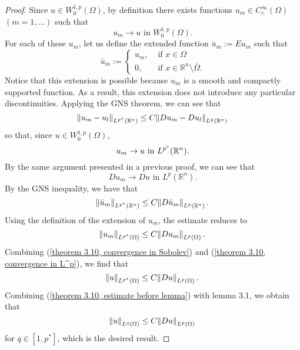 \documentclass[10pt]{article}
\begin{document}
\begin{proof}
	Since $u \in W^{1,p}_0(\Omega)$, by definition there exists functions $u_m \in C^\infty_c(\Omega)$ $(m = 1,\dots)$ such that 
	\begin{equation*}
		\displaystyle u_m \to u \textrm{ in } W^{1,p}_0(\Omega).
	\end{equation*}
	For each of these $u_m$, let us define the extended function $\bar{u}_m := Eu_m$ such that 
	\begin{equation*}
		\displaystyle \bar{u}_m := \begin{cases}
			u_m, & \textrm{ if } x \in \Omega \\
			0, & \textrm{ if } x \in \mathbb{R}^n \setminus \bar{\Omega}.
		\end{cases}
	\end{equation*} 
	Notice that this extension is possible because $u_m$ is a smooth and compactly supported function. As a result, this extension does not introduce any particular discontinuities. Applying the GNS theorem, we can see that 
	\begin{equation*}
		\displaystyle \norm{u_m - u_l}_{L^{p^*}(\mathbb{R}^n)} \leq C \norm{Du_m - Du_l}_{L^p(\mathbb{R}^n)}
	\end{equation*}
	so that, since $u \in W^{1,p}_0(\Omega)$, 
	\begin{equation}
		\label{theorem 3.10, convergence in Sobolev}
		\displaystyle u_m \to u \textrm{ in } L^{p^*}(\mathbb{R}^n). 
	\end{equation}
	By the same argument presented in a previous proof, we can see that 
	\begin{equation}
		\label{theorem 3.10, convergence in L^p}		
		\displaystyle Du_m \to Du \textrm{ in } L^p(\mathbb{R}^n).
	\end{equation}
	By the GNS inequality, we have that 
	\begin{equation*}
		\displaystyle \norm{\bar{u}_m}_{L^{p^*}(\mathbb{R}^n)} \leq C \norm{D\bar{u}_m}_{L^p(\mathbb{R}^n)}. 
	\end{equation*}
	Using the definition of the extension of $u_m$, the estimate reduces to 
	\begin{equation*}
		\displaystyle \norm{u_m}_{L^{p^*}(\Omega)} \leq C \norm{Du_m}_{L^p(\Omega)}.
	\end{equation*}
	Combining (\ref{theorem 3.10, convergence in Sobolev}) and (\ref{theorem 3.10, convergence in L^p}), we find that 
	\begin{equation}
		\label{theorem 3.10, estimate before lemma}
		\displaystyle \norm{u}_{L^{p^*}(\Omega)} \leq C \norm{Du}_{L^p(\Omega)}.
	\end{equation}
	Combining (\ref{theorem 3.10, estimate before lemma}) with lemma 3.1, we obtain that 
	\begin{equation*}
		\displaystyle \norm{u}_{L^q(\Omega)} \leq C \norm{Du}_{L^p(\Omega)}
	\end{equation*}
	for $q \in [1,p^*]$, which is the desired result. 
\end{proof}
\end{document}
